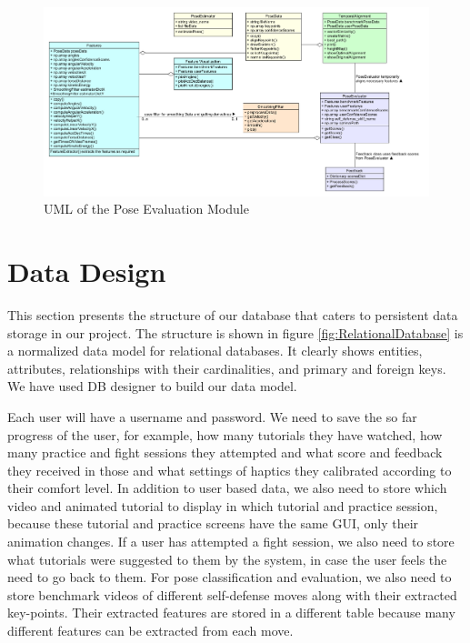 \begin{figure}
  \centering
  \includegraphics[scale=0.34]{images/UML - Pose Evaluation Module.png}
  \caption{UML of the Pose Evaluation Module}
  \label{fig:UML_PoseEvaluation}
\end{figure}



\section{Data Design}

This section presents the structure of our database that caters to persistent data storage in our project. The structure is shown in figure \ref{fig:RelationalDatabase} is a normalized data model for relational databases. It clearly shows entities, attributes, relationships with their cardinalities, and primary and foreign keys. We have used DB designer to build our data model.


Each user will have a username and password. We need to save the so far progress of the user, for example, how many tutorials they have watched, how many practice and fight sessions they attempted and what score and feedback they received in those and what settings of haptics they calibrated according to their comfort level. In addition to user based data, we also need to store which video and animated tutorial to display in which tutorial and practice session, because these tutorial and practice screens have the same GUI, only their animation changes. If a user has attempted a fight session, we also need to store what tutorials were suggested to them by the system, in case the user feels the need to go back to them. For pose classification and evaluation, we also need to store benchmark videos of different self-defense moves along with their extracted key-points. Their extracted features are stored in a different table because many different features can be extracted from each move. 

